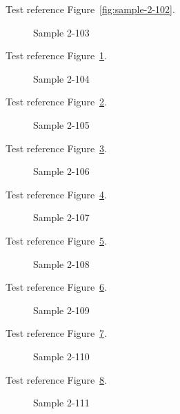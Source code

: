 Test reference Figure~\ref{fig:sample-2-102}.

\begin{figure}[tbhp]
\caption{Sample 2-103}
\label{fig:sample-2-103}
\end{figure}

Test reference Figure~\ref{fig:sample-2-103}.

\begin{figure}[tbhp]
\caption{Sample 2-104}
\label{fig:sample-2-104}
\end{figure}

Test reference Figure~\ref{fig:sample-2-104}.

\begin{figure}[tbhp]
\caption{Sample 2-105}
\label{fig:sample-2-105}
\end{figure}

Test reference Figure~\ref{fig:sample-2-105}.

\begin{figure}[tbhp]
\caption{Sample 2-106}
\label{fig:sample-2-106}
\end{figure}

Test reference Figure~\ref{fig:sample-2-106}.

\begin{figure}[tbhp]
\caption{Sample 2-107}
\label{fig:sample-2-107}
\end{figure}

Test reference Figure~\ref{fig:sample-2-107}.

\begin{figure}[tbhp]
\caption{Sample 2-108}
\label{fig:sample-2-108}
\end{figure}

Test reference Figure~\ref{fig:sample-2-108}.

\begin{figure}[tbhp]
\caption{Sample 2-109}
\label{fig:sample-2-109}
\end{figure}

Test reference Figure~\ref{fig:sample-2-109}.

\begin{figure}[tbhp]
\caption{Sample 2-110}
\label{fig:sample-2-110}
\end{figure}

Test reference Figure~\ref{fig:sample-2-110}.

\begin{figure}[tbhp]
\caption{Sample 2-111}
\label{fig:sample-2-111}
\end{figure}

